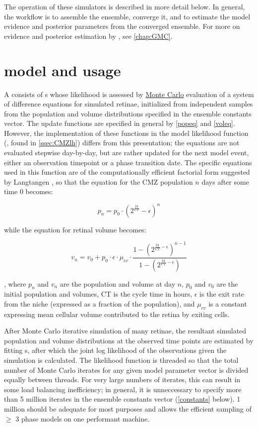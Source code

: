 The operation of these simulators is described in more detail below. In general, the workflow is to assemble the ensemble, converge it, and to estimate the model evidence and posterior parameters from the converged ensemble. For more on evidence and posterior estimation by , see \autoref{chap:GMC}.

\section{\protect{} model and usage}
\label{sec:CMZmodel}
A  consists of s whose likelihood is assessed by \hyperref[ssec:MonteCarlo]{Monte Carlo} evaluation of a system of difference equations for simulated retinae, initialized from independent samples from the population and volume distributions specified in the ensemble constants vector. The update functions are specified in general by \autoref{popeq} and \autoref{voleq}. However, the implementation of these functions in the model likelihood function (, found in \autoref{ssec:CMZlh}) differs from this presentation; the equations are not evaluated stepwise day-by-day, but are rather updated for the next model event, either an observation timepoint or a phase transition date. The specific equations used in this function are of the computationally efficient factorial form suggested by Langtangen \cite[p. 559]{Langtangen2012}, so that the equation for the CMZ population $n$ days after some time 0 becomes:

\[
    p_n=p_{0} \cdot (2^{\frac{24}{CT}} - \epsilon)^{n}
\]

while the equation for retinal volume becomes:

\[
    v_n=v_{0} + p_{0} \cdot \epsilon \cdot \mu_{cv} \cdot \frac{1 - (2^{\frac{24}{CT} - \epsilon})^{n-1}}{1 - (2^{\frac{24}{CT} - \epsilon})}
\]

, where $p_n$ and $v_n$ are the population and volume at day $n$, $p_{0}$ and $v_{0}$ are the initial population and volumes, CT is the cycle time in hours, $\epsilon$ is the exit rate from the niche (expressed as a fraction of the population), and $\mu_{cv}$ is a constant expressing mean cellular volume contributed to the retina by exiting cells.

After Monte Carlo iterative simulation of many retinae, the resultant simulated population and volume distributions at the observed time points are estimated by fitting  s, after which the joint log likelihood of the observations given the simulation is calculated. The likelihood function is threaded so that the total number of Monte Carlo iterates for any given model parameter vector is divided equally between threads. For very large numbers of iterates, this can result in some load balancing inefficiency; in general, it is unneccessary to specify more than 5 million iterates in the ensemble constants vector (\autoref{constants} below). 1 million should be adequate for most purposes and allows the efficient sampling of $\geq$ 3 phase models on one performant machine.

